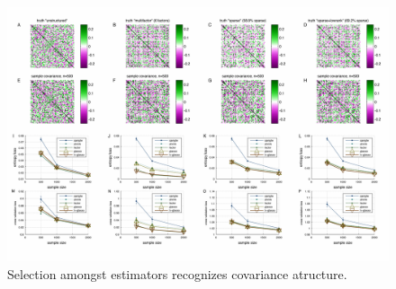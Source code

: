 \begin{figure}[htp]
\centering
\includegraphics[width=1.0\textwidth]{figures/Figure3.pdf}
\caption{
Selection amongst estimators recognizes covariance atructure.
}\label{fig:03}
\end{figure}
